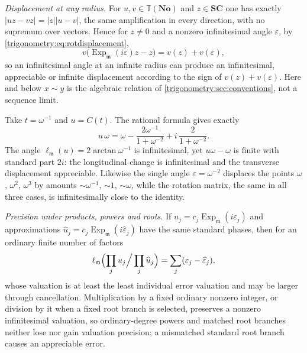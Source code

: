 \documentclass[11pt,letterpaper]{article}
\numberwithin{equation}{section}
\theoremstyle{definition}
\theoremstyle{remark}
\newcommand{\No}{\mathbf{No}}
\newcommand{\SC}{\mathbf{SC}}
\newcommand{\mm}{\mathfrak m}
\newcommand{\TT}{\mathbb T}
\newcommand{\eps}{\varepsilon}
\newcommand{\Ex}{\operatorname{Exp}_{\mm}}
\newcommand{\ellm}{\ell_{\mm}}
\begin{document}
\emph{Displacement at any radius.} For $u,v\in\TT(\No)$ and $z\in\SC$ one has exactly
$|uz-vz|=|z||u-v|$, the same amplification in every direction, with no supremum over vectors. Hence
for $z\ne0$ and a nonzero infinitesimal angle $\eps$, by \cref{trigonometry:eq:rotdisplacement},
\begin{equation}\label{trigonometry:rot:eq:dispval}
 v\bigl(\Ex(i\eps)z-z\bigr)=v(z)+v(\eps),
\end{equation}
so an infinitesimal angle at an infinite radius can produce an infinitesimal, appreciable or infinite
displacement according to the sign of $v(z)+v(\eps)$. Here and below $x\sim y$ is the algebraic
relation of \cref{trigonometry:sec:conventions}, not a sequence limit.

\begin{example}\label{trigonometry:rot:ex:cayleydisp}
Take $t=\omega^{-1}$ and $u=C(t)$. The rational formula gives exactly
\[
 u\,\omega=\omega-\frac{2\omega^{-1}}{1+\omega^{-2}}+i\,\frac2{1+\omega^{-2}} .
\]
The angle $\ellm(u)=2\arctan\omega^{-1}$ is infinitesimal, yet $u\omega-\omega$ is finite with
standard part $2i$: the longitudinal change is infinitesimal and the transverse displacement
appreciable. Likewise the single angle $\eps=\omega^{-2}$ displaces the points $\omega$, $\omega^2$,
$\omega^3$ by amounts $\sim\omega^{-1}$, $\sim1$, $\sim\omega$, while the rotation matrix, the same in
all three cases, is infinitesimally close to the identity.
\end{example}

\emph{Precision under products, powers and roots.} If $u_j=c_j\Ex(i\eps_j)$ and approximations
$\widehat u_j=c_j\Ex(i\widehat\eps_j)$ have the same standard phases, then for an ordinary finite
number of factors
\begin{equation}\label{trigonometry:rot:eq:producterror}
 \ellm\Bigl(\prod_ju_j\Big/\prod_j\widehat u_j\Bigr)=\sum_j(\eps_j-\widehat\eps_j),
\end{equation}
whose valuation is at least the least individual error valuation and may be larger through
cancellation. Multiplication by a fixed ordinary nonzero integer, or division by it when a fixed root
branch is selected, preserves a nonzero infinitesimal valuation, so ordinary-degree powers and
matched root branches neither lose nor gain valuation precision; a mismatched standard root branch
causes an appreciable error.
\end{document}
